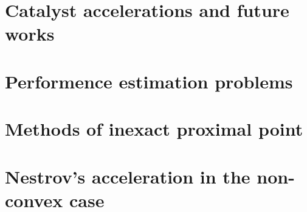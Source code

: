 \documentclass[12pt]{article}
\begin{document}
\section{Catalyst accelerations and future works}
\section{Performence estimation problems}
\section{Methods of inexact proximal point}
\section{Nestrov's acceleration in the non-convex case}





\newpage

\appendix
\end{document}
